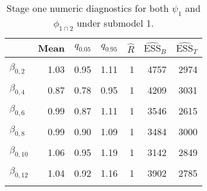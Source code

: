 \begin{table}

\caption{\label{tab:surv-stage-one-submodel-one}Stage one numeric diagnostics for both $\psi_{1}$ and $\phi_{1 \cap 2}$ under submodel 1.}
\centering
\begin{tabular}[t]{lrrrrrr}
\toprule
  & Mean & $q_{0.05}$ & $q_{0.95}$ & $\widehat{R}$ & $\widehat{\text{ESS}}_{B}$ & $\widehat{\text{ESS}}_{T}$\\
\midrule
\cellcolor{gray!6}{$\beta_{0, 1}$} & \cellcolor{gray!6}{0.98} & \cellcolor{gray!6}{0.88} & \cellcolor{gray!6}{1.09} & \cellcolor{gray!6}{1} & \cellcolor{gray!6}{3603} & \cellcolor{gray!6}{2926}\\
$\beta_{0, 2}$ & 1.03 & 0.95 & 1.11 & 1 & 4757 & 2974\\
\cellcolor{gray!6}{$\beta_{0, 3}$} & \cellcolor{gray!6}{1.15} & \cellcolor{gray!6}{1.05} & \cellcolor{gray!6}{1.25} & \cellcolor{gray!6}{1} & \cellcolor{gray!6}{4510} & \cellcolor{gray!6}{3217}\\
$\beta_{0, 4}$ & 0.87 & 0.78 & 0.95 & 1 & 4209 & 3031\\
\cellcolor{gray!6}{$\beta_{0, 5}$} & \cellcolor{gray!6}{0.92} & \cellcolor{gray!6}{0.81} & \cellcolor{gray!6}{1.02} & \cellcolor{gray!6}{1} & \cellcolor{gray!6}{3827} & \cellcolor{gray!6}{2407}\\
$\beta_{0, 6}$ & 0.99 & 0.87 & 1.11 & 1 & 3546 & 2615\\
\cellcolor{gray!6}{$\beta_{0, 7}$} & \cellcolor{gray!6}{1.13} & \cellcolor{gray!6}{0.99} & \cellcolor{gray!6}{1.27} & \cellcolor{gray!6}{1} & \cellcolor{gray!6}{3361} & \cellcolor{gray!6}{2174}\\
$\beta_{0, 8}$ & 0.99 & 0.90 & 1.09 & 1 & 3484 & 3000\\
\cellcolor{gray!6}{$\beta_{0, 9}$} & \cellcolor{gray!6}{0.88} & \cellcolor{gray!6}{0.76} & \cellcolor{gray!6}{1.00} & \cellcolor{gray!6}{1} & \cellcolor{gray!6}{4005} & \cellcolor{gray!6}{2862}\\
$\beta_{0, 10}$ & 1.06 & 0.95 & 1.19 & 1 & 3142 & 2849\\
\cellcolor{gray!6}{$\beta_{0, 11}$} & \cellcolor{gray!6}{0.86} & \cellcolor{gray!6}{0.74} & \cellcolor{gray!6}{0.98} & \cellcolor{gray!6}{1} & \cellcolor{gray!6}{3472} & \cellcolor{gray!6}{2032}\\
$\beta_{0, 12}$ & 1.04 & 0.92 & 1.16 & 1 & 3902 & 2785\\
\cellcolor{gray!6}{$\beta_{0, 13}$} & \cellcolor{gray!6}{0.94} & \cellcolor{gray!6}{0.87} & \cellcolor{gray!6}{1.01} & \cellcolor{gray!6}{1} & \cellcolor{gray!6}{4884} & \cellcolor{gray!6}{2951}\\

\end{tabular}
\end{table}
